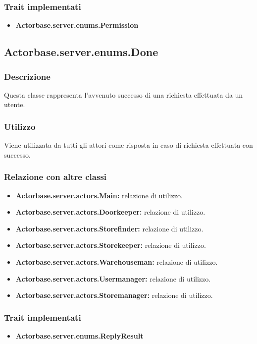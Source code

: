 \documentclass[a4paper]{article}
\begin{document}
			\subsubsection{Trait implementati}
				\begin{itemize}
					\item \textbf{Actorbase.server.enums.Permission} 
				\end{itemize}
		
		\subsection{Actorbase.server.enums.Done}
			\subsubsection{Descrizione}
				Questa classe rappresenta l'avvenuto successo di una richiesta effettuata da un utente.
				
			\subsubsection{Utilizzo}
				Viene utilizzata da tutti gli attori come risposta in caso di richiesta effettuata con successo.
				
			\subsubsection{Relazione con altre classi}
				\begin{itemize}
					\item \textbf{Actorbase.server.actors.Main:} relazione di utilizzo.
					\item \textbf{Actorbase.server.actors.Doorkeeper:} relazione di utilizzo.
					\item \textbf{Actorbase.server.actors.Storefinder:} relazione di utilizzo.
					\item \textbf{Actorbase.server.actors.Storekeeper:} relazione di utilizzo.
					\item \textbf{Actorbase.server.actors.Warehouseman:} relazione di utilizzo.
					\item \textbf{Actorbase.server.actors.Usermanager:} relazione di utilizzo.
					\item \textbf{Actorbase.server.actors.Storemanager:} relazione di utilizzo.
				\end{itemize}
		
			\subsubsection{Trait implementati}
				\begin{itemize}
					\item \textbf{Actorbase.server.enums.ReplyResult} 
				\end{itemize}
				
\end{document}
